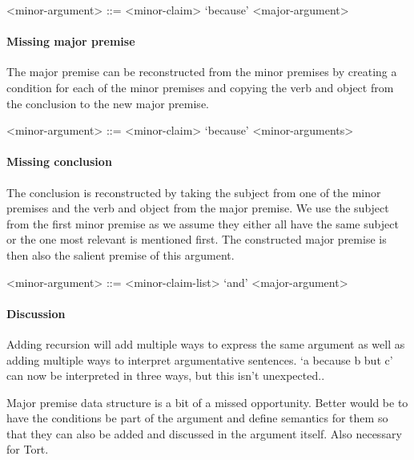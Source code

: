 \begin{grammar}
<minor-argument> ::= <minor-claim> `because' <major-argument> %
\end{grammar}


\paragraph{Missing major premise}
The major premise can be reconstructed from the minor premises by creating a condition for each of the minor premises and copying the verb and object from the conclusion to the new major premise.

\begin{grammar}
<minor-argument> ::= <minor-claim> `because' <minor-arguments> %
\end{grammar}


\paragraph{Missing conclusion}
The conclusion is reconstructed by taking the subject from one of the minor premises and the verb and object from the major premise. We use the subject from the first minor premise as we assume they either all have the same subject or the one most relevant is mentioned first. The constructed major premise is then also the salient premise of this argument.

\begin{grammar}
<minor-argument> ::= <minor-claim-list> `and' <major-argument> %
\end{grammar}


\paragraph{Discussion}
Adding recursion will add multiple ways to express the same argument as well as adding multiple ways to interpret argumentative sentences. `a because b but c' can now be interpreted in three ways, but this isn't unexpected..

Major premise data structure is a bit of a missed opportunity. Better would be to have the conditions be part of the argument and define semantics for them so that they can also be added and discussed in the argument itself. Also necessary for Tort.